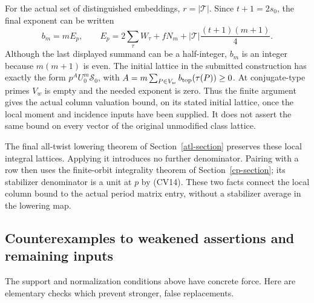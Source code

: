 For the actual set of distinguished embeddings, $r=|\mathcal T|$.
Since $t+1=2s_0$, the final exponent can be written
\begin{equation}\label{cv-final-exponent}
 b_m=mE_p,\qquad
 E_p=2\sum_\tau W_\tau+fN_m
                    +|\mathcal T|\frac{(t+1)(m+1)}4.
\end{equation}
Although the last displayed summand can be a half-integer, $b_m$
is an integer because $m(m+1)$ is even.
The initial lattice in the submitted construction has exactly the
form $p^AU_0^m\mathscr S_0$, with
$A=m\sum_{P\in V_w}b_{\rm top}(\tau(P))\ge0$.
At conjugate-type primes $V_w$ is empty and the needed exponent is
zero.  Thus the finite argument gives the actual column valuation
bound, on its stated initial lattice, once the local moment and
incidence inputs have been supplied.  It does not assert the same
bound on every vector of the original unmodified class lattice.

The final all-twist lowering theorem of
Section~\ref{atl-section} preserves these local integral lattices.
Applying it introduces no further denominator.  Pairing with a row
then uses the finite-orbit integrality theorem of
Section~\ref{cp-section}; its stabilizer denominator is a unit at
$p$ by (CV14).  These two facts connect the local column bound to
the actual period matrix entry, without a stabilizer average in the
lowering map.

\subsection{Counterexamples to weakened assertions and remaining inputs}

The support and normalization conditions above have concrete force.
Here are elementary checks which prevent stronger, false replacements.


